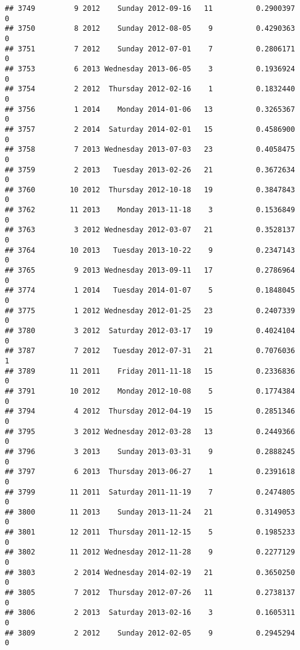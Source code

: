 \documentclass[
]{article}
\begin{document}
\begin{verbatim}
## 3749         9 2012    Sunday 2012-09-16   11          0.2900397             0
## 3750         8 2012    Sunday 2012-08-05    9          0.4290363             0
## 3751         7 2012    Sunday 2012-07-01    7          0.2806171             0
## 3753         6 2013 Wednesday 2013-06-05    3          0.1936924             0
## 3754         2 2012  Thursday 2012-02-16    1          0.1832440             0
## 3756         1 2014    Monday 2014-01-06   13          0.3265367             0
## 3757         2 2014  Saturday 2014-02-01   15          0.4586900             0
## 3758         7 2013 Wednesday 2013-07-03   23          0.4058475             0
## 3759         2 2013   Tuesday 2013-02-26   21          0.3672634             0
## 3760        10 2012  Thursday 2012-10-18   19          0.3847843             0
## 3762        11 2013    Monday 2013-11-18    3          0.1536849             0
## 3763         3 2012 Wednesday 2012-03-07   21          0.3528137             0
## 3764        10 2013   Tuesday 2013-10-22    9          0.2347143             0
## 3765         9 2013 Wednesday 2013-09-11   17          0.2786964             0
## 3774         1 2014   Tuesday 2014-01-07    5          0.1848045             0
## 3775         1 2012 Wednesday 2012-01-25   23          0.2407339             0
## 3780         3 2012  Saturday 2012-03-17   19          0.4024104             0
## 3787         7 2012   Tuesday 2012-07-31   21          0.7076036             1
## 3789        11 2011    Friday 2011-11-18   15          0.2336836             0
## 3791        10 2012    Monday 2012-10-08    5          0.1774384             0
## 3794         4 2012  Thursday 2012-04-19   15          0.2851346             0
## 3795         3 2012 Wednesday 2012-03-28   13          0.2449366             0
## 3796         3 2013    Sunday 2013-03-31    9          0.2888245             0
## 3797         6 2013  Thursday 2013-06-27    1          0.2391618             0
## 3799        11 2011  Saturday 2011-11-19    7          0.2474805             0
## 3800        11 2013    Sunday 2013-11-24   21          0.3149053             0
## 3801        12 2011  Thursday 2011-12-15    5          0.1985233             0
## 3802        11 2012 Wednesday 2012-11-28    9          0.2277129             0
## 3803         2 2014 Wednesday 2014-02-19   21          0.3650250             0
## 3805         7 2012  Thursday 2012-07-26   11          0.2738137             0
## 3806         2 2013  Saturday 2013-02-16    3          0.1605311             0
## 3809         2 2012    Sunday 2012-02-05    9          0.2945294             0

\end{verbatim}
\end{document}
